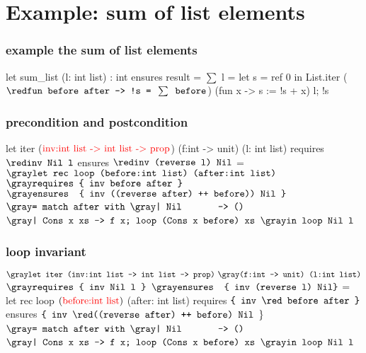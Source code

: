 \documentclass[xcolor=dvipsnames]{beamer}
\begin{document}
\section*{Example: sum of list elements} 
\begin{frame}[fragile]
\frametitle{example the sum of list elements}
\hspace*{-1em}
\begin{footnotesize}
\begin{whycode}
 let sum_list (l: int list) : int
 ensures { result = $\sum$ l }
 = let s = ref 0 in
   List.iter 
     (${\red\texttt{fun before after -> !s = }\sum \texttt{ before}}$) (fun x -> s := !s + x) l; 
   !s     
\end{whycode}
\end{footnotesize}
\end{frame}

\begin{frame}[fragile]
\frametitle{precondition and postcondition}
\hspace*{-4em}
\begin{footnotesize}
\begin{whycode}
let iter ($\textcolor{red}{\text{inv:int list -> int list -> prop}}$) (f:int -> unit) (l: int list)
requires { ${\red \texttt{inv Nil l}}$ }
ensures  { ${\red \texttt{inv (reverse l) Nil}}$ } 
= ${\gray\texttt{let rec loop (before:int list) (after:int list)}}$
  ${\gray\texttt{requires \{ inv before after \} }}$
  ${\gray\texttt{ensures~ \{ inv ((reverse after) ++ before)) Nil \}}}$  
  ${\gray\texttt{= match after with}}$
     ${\gray\texttt{| Nil~~~~~~ -> ()}}$
     ${\gray\texttt{| Cons x xs -> f x; loop (Cons x before) xs}}$
  ${\gray\texttt{in loop Nil l }}$
\end{whycode}
\end{footnotesize}
\end{frame}
\addtocounter{framenumber}{-1}



\begin{frame}[fragile]
\frametitle{loop invariant}
\hspace*{-1em}
\begin{footnotesize}
\begin{whycode}
${\gray\texttt{let iter (inv:int list -> int list -> prop)}} ~
{\gray\texttt{(f:int -> unit) (l:int list)}}$
${\gray\texttt{requires \{ inv Nil l \}}}$
${\gray\texttt{ensures~ \{ inv (reverse l) Nil\}}}$    
= let rec loop $(\textcolor{red}{\text{before:int list}})$ (after: int list) 
  requires $\texttt{\{ inv {\red before after} \}}$
  ensures  $\texttt{\{ inv {\red((reverse after) ++ before) Nil }}\}$  
  ${\gray\texttt{= match after with}}$
     ${\gray\texttt{| Nil~~~~~~ -> ()}}$
     ${\gray\texttt{| Cons x xs -> f x; loop (Cons x before) xs}}$
  ${\gray\texttt{in loop Nil l }}$
\end{whycode}
\end{footnotesize}
\end{frame}
\addtocounter{framenumber}{-1}
\end{document}
